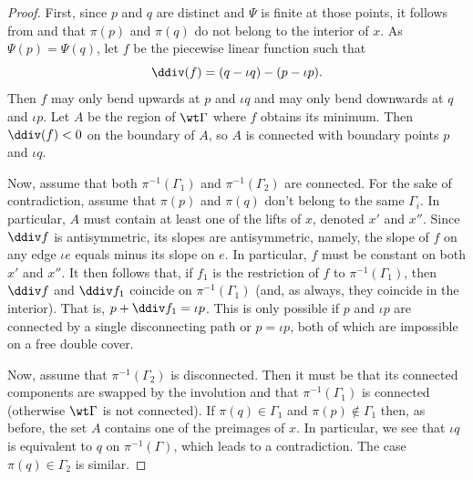 \begin{proof}
First, since $p$ and $q$ are distinct and $\Psi$ is finite at those points, it follows from  and    that $\pi(p)$ and $\pi(q)$ do not belong to the interior of $x$.   
As $\Psi(p) = \Psi(q)$, let $f$ be the piecewise linear function such that 
    \[
    \ddiv(f) = (q - \iota q) - (p-\iota p). 
    \]
    Then $f$ may only bend upwards at $p$ and $\iota q$ and may only bend downwards at $q$ and $\iota p$. Let $A$ be the region of $\wt\Gamma$ where $f$ obtains its minimum. Then $\ddiv(f) < 0$ on the boundary of $A$, so $A$ is connected with boundary points $p$ and $\iota q$. 
    
    Now, assume that both $\pi^{-1}({\Gamma_1})$ and $\pi^{-1}(\Gamma_2)$ are connected. For the sake of contradiction, assume that  $\pi(p)$ and $\pi(q)$ don't belong to the same  $\Gamma_i$.
    In particular,  $A$  must contain at least one of the lifts of $x$, denoted $x'$ and $x''$. Since $\ddiv f$ is antisymmetric, its slopes are antisymmetric, namely, the slope of $f$ on any edge $\iota e$ equals minus its slope on $e$. In particular, $f$ must be constant on both $x'$ and $x''$.  It then follows that, if $f_1$ is the restriction of $f$ to $\pi^{-1}(\Gamma_1)$, then $\ddiv f$ and $\ddiv f_1$ coincide on $\pi^{-1}(\Gamma_1)$ (and, as always, they coincide in the interior). That is, 
     $p + \ddiv f_1 = \iota p$. This is only possible if  $p$ and $\iota p$ are connected by a single disconnecting path or $p = \iota p$, both of which are impossible on a free double cover. 

Now, assume that  $\pi^{-1}(\Gamma_2)$ is disconnected. Then it must be that its connected components are swapped by the involution and that $\pi^{-1}(\Gamma_1)$ is connected (otherwise $\wt\Gamma$ is not connected).  
If $\pi(q)\in\Gamma_1$ and $\pi(p)\notin\Gamma_1$ then, as before, the set  $A$ contains one of the preimages of $x$. In particular, we see that $\iota q$ is equivalent to $q$ on $\pi^{-1}(\Gamma)$, which leads to a contradiction. The case $\pi(q)\in\Gamma_2$ is similar. 
\end{proof}


